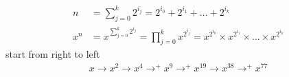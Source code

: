 \documentclass[12pt,border=4pt,multi]{article} %
\begin{document}
\section*{}
\begin{align*}
n &= \sum_{j = 0}^k 2^{i_j} = 2^{i_0} + 2^{i_1} + ... + 2^{i_k}\\
x^n &= x^{\sum_{j = 0}^k 2^{i_j}} = \prod_{j = 0}^k x^{2^{i_j}} = x^{2^{i_0}} \times x^{2^{i_1}} \times ... \times x^{2^{i_k}}
\end{align*}
start from right to left
\begin{align*}
x \rightarrow x^2 \rightarrow x^4 \rightarrow ^+ x^9 \rightarrow ^+ x^{19} \rightarrow x^{38} \rightarrow ^+ x^{77}\\
\end{align*}
\end{document}
